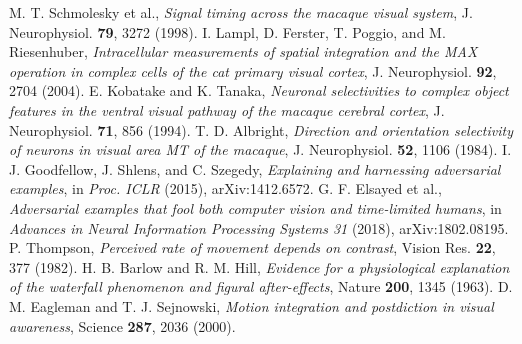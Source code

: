  M. T. Schmolesky et al., \emph{Signal timing across the macaque visual system}, J. Neurophysiol. \textbf{79}, 3272 (1998).
 I. Lampl, D. Ferster, T. Poggio, and M. Riesenhuber, \emph{Intracellular measurements of spatial integration and the MAX operation in complex cells of the cat primary visual cortex}, J. Neurophysiol. \textbf{92}, 2704 (2004).
 E. Kobatake and K. Tanaka, \emph{Neuronal selectivities to complex object features in the ventral visual pathway of the macaque cerebral cortex}, J. Neurophysiol. \textbf{71}, 856 (1994).
 T. D. Albright, \emph{Direction and orientation selectivity of neurons in visual area MT of the macaque}, J. Neurophysiol. \textbf{52}, 1106 (1984).
 I. J. Goodfellow, J. Shlens, and C. Szegedy, \emph{Explaining and harnessing adversarial examples}, in \emph{Proc. ICLR} (2015), arXiv:1412.6572.
 G. F. Elsayed et al., \emph{Adversarial examples that fool both computer vision and time-limited humans}, in \emph{Advances in Neural Information Processing Systems 31} (2018), arXiv:1802.08195.
 P. Thompson, \emph{Perceived rate of movement depends on contrast}, Vision Res. \textbf{22}, 377 (1982).
 H. B. Barlow and R. M. Hill, \emph{Evidence for a physiological explanation of the waterfall phenomenon and figural after-effects}, Nature \textbf{200}, 1345 (1963).
 D. M. Eagleman and T. J. Sejnowski, \emph{Motion integration and postdiction in visual awareness}, Science \textbf{287}, 2036 (2000).

